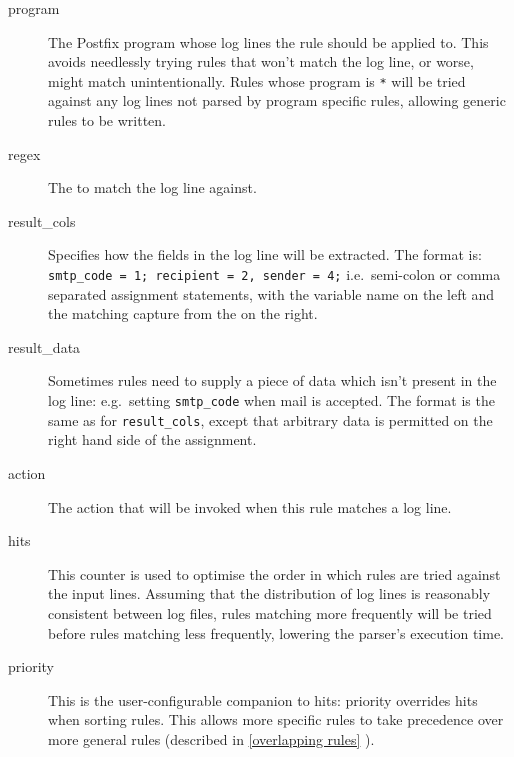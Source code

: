 \documentclass[draft]{svmult}
\newcommand{\refwithpage}[1]{%
    \empty{}\vref{#1}%
}
\newcommand{\sectionref}[1]{%
    \textsection{}\vref*{#1}%
}
\newcommand{\tab}[0]{%
    \hspace*{2em}%
}
\begin{document}
\begin{description}

    \item [program] The Postfix program whose log lines the rule should be
        applied to.  This avoids needlessly trying rules that won't match
        the log line, or worse, might match unintentionally.  Rules whose
        program is \texttt{*} will be tried against any log lines not
        parsed by program specific rules, allowing generic rules to be
        written.

    \item [regex] The \regex{} to match the log line against.

    \item [result\_cols] Specifies how the fields in the log line will be
        extracted.  The format is:
        \tab{} \texttt{smtp\_code = 1; recipient = 2, sender = 4;} \newline
        i.e.\ semi-colon or comma separated assignment statements, with the
        variable name on the left and the matching capture from the
        \regex{} on the right.

    \item [result\_data] Sometimes rules need to supply a piece of data
        which isn't present in the log line: e.g.\ setting
        \texttt{smtp\_code} when mail is accepted.  The format is the same
        as for \texttt{result\_cols}, except that arbitrary data is
        permitted on the right hand side of the assignment.

    \item [action] The action that will be invoked when this rule matches a
        log line.

    \item [hits] This counter is used to optimise the order in which rules
        are tried against the input lines.  Assuming that the distribution
        of log lines is reasonably consistent between log files, rules
        matching more frequently will be tried before rules matching less
        frequently, lowering the parser's execution time.

    \item [priority] This is the user-configurable companion to hits:
        priority overrides hits when sorting rules.  This allows more
        specific rules to take precedence over more general rules
        (described in \sectionref{overlapping rules}).

\end{description}
\end{document}
